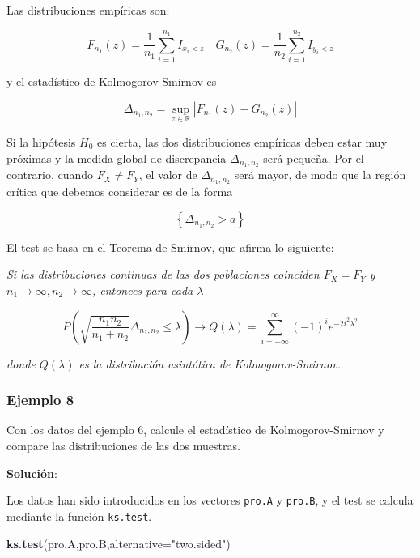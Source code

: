 \documentclass[
]{article}
\newenvironment{Shaded}{\begin{snugshade}}{\end{snugshade}}
\newcommand{\AttributeTok}[1]{\textcolor[rgb]{0.13,0.29,0.53}{#1}}
\newcommand{\FunctionTok}[1]{\textcolor[rgb]{0.13,0.29,0.53}{\textbf{#1}}}
\newcommand{\NormalTok}[1]{#1}
\newcommand{\StringTok}[1]{\textcolor[rgb]{0.31,0.60,0.02}{#1}}
\begin{document}
Las distribuciones empíricas son:

\[
F_{n_{1}}(z)=\frac{1}{n_{1}} \sum_{i=1}^{n_{1}} I_{x_{i}<z} \quad
G_{n_{2}}(z)=\frac{1}{n_{2}} \sum_{i=1}^{n_{2}} I_{y_{i}<z}
\]

y el estadístico de Kolmogorov-Smirnov es

\[
\Delta_{n_{1}, n_{2}}=\sup _{z \in \mathbb{R}}\left|F_{n_{1}}(z)-G_{n_{2}}(z)\right|
\]

Si la hipótesis \(H_{0}\) es cierta, las dos distribuciones empíricas deben estar muy próximas y la medida global de discrepancia \(\Delta_{n_{1}, n_{2}}\) será pequeña. Por el contrario, cuando \(F_{X} \neq F_{Y}\), el valor de \(\Delta_{n_{1}, n_{2}}\) será mayor, de modo que la región crítica que debemos considerar es de la forma

\[
\left\{\Delta_{n_{1}, n_{2}}>a\right\}
\]

El test se basa en el Teorema de Smirnov, que afirma lo siguiente:

\emph{Si las distribuciones continuas de las dos poblaciones coinciden \(F_{X}=F_{Y}\) y \(n_{1} \rightarrow \infty, n_{2} \rightarrow \infty\), entonces para cada \(\lambda\)}

\[
P\left(\sqrt{\frac{n_{1} n_{2}}{n_{1}+n_{2}}} \Delta_{n_{1}, n_{2}} \leq \lambda\right)
\rightarrow
Q(\lambda)=\sum_{i=-\infty}^{\infty}(-1)^{i} e^{-2 i^{2} \lambda^{2}}
\]

\emph{donde \(Q(\lambda)\) es la distribución asintótica de Kolmogorov-Smirnov.}

\subsubsection{Ejemplo 8}\label{ejemplo-8-1}

Con los datos del ejemplo 6, calcule el estadístico de Kolmogorov-Smirnov y compare las distribuciones de las dos muestras.

\textbf{Solución}:

Los datos han sido introducidos en los vectores \texttt{pro.A} y \texttt{pro.B}, y el test se calcula mediante la función \texttt{ks.test}.

\begin{Shaded}
\begin{Highlighting}[]
\FunctionTok{ks.test}\NormalTok{(pro.A,pro.B,}\AttributeTok{alternative=}\StringTok{"two.sided"}\NormalTok{)}
\end{Highlighting}
\end{Shaded}
\end{document}
